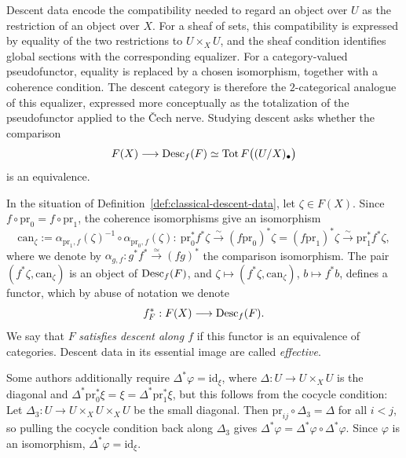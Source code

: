 Descent data encode the compatibility needed to regard an object
over $U$ as the restriction of an object over $X$. For a sheaf of
sets, this compatibility is expressed by equality of the two
restrictions to $U\times_XU$, and the sheaf condition identifies
global sections with the corresponding equalizer. For a
category-valued pseudofunctor, equality is replaced by a chosen
isomorphism, together with a coherence condition. The descent
category is therefore the $2$-categorical analogue of this
equalizer, expressed more conceptually as the totalization of
the pseudofunctor applied to the \v{C}ech nerve. Studying descent
asks whether the comparison
\[
F(X)\longrightarrow \operatorname{Desc}_f(F)
\simeq \operatorname{Tot} F\bigl((U/X)_\bullet\bigr)
\]
is an equivalence.

\begin{definition}\label{con:pullback-to-descent}
	In the situation of Definition~\ref{def:classical-descent-data}, let $\zeta\in F(X)$. Since $f\circ\mathrm{pr}_0=f\circ\mathrm{pr}_1$, the coherence isomorphisms give an isomorphism
	\[
	\mathrm{can}_\zeta:=\alpha_{\mathrm{pr}_1,f}(\zeta)^{-1}\circ\alpha_{\mathrm{pr}_0,f}(\zeta):\ \mathrm{pr}_0^*f^*\zeta\xrightarrow{\ \sim\ }(f\mathrm{pr}_0)^*\zeta=(f\mathrm{pr}_1)^*\zeta\xrightarrow{\ \sim\ }\mathrm{pr}_1^*f^*\zeta,
	\]
	where we denote by $\alpha_{g,f}: g^*f^* \xrightarrow{\simeq} (fg)^*$ the comparison isomorphism.
	The pair $(f^*\zeta,\mathrm{can}_\zeta)$ is an object of $\operatorname{Desc}_f(F)$, and $\zeta\mapsto(f^*\zeta,\mathrm{can}_\zeta)$, $b\mapsto f^*b$, defines a functor, which by abuse of notation we denote
	\[
	f_F^*:F(X)\longrightarrow\operatorname{Desc}_f(F).
	\]
	We say that $F$ \emph{satisfies descent along $f$} if this functor is an equivalence of categories. Descent data in its essential image are called \emph{effective}.
\end{definition}

\begin{remark}\label{rem:normalization-automatic}
	Some authors additionally require $\Delta^*\varphi=\mathrm{id}_\xi$, where $\Delta:U\to U\times_XU$ is the diagonal and $\Delta^*\mathrm{pr}_0^*\xi=\xi=\Delta^*\mathrm{pr}_1^*\xi$, but this follows from the cocycle condition: 
	Let $\Delta_3:U\to U\times_XU\times_XU$ be the small diagonal. Then $\mathrm{pr}_{ij}\circ\Delta_3=\Delta$ for all $i<j$, so pulling the cocycle condition back along $\Delta_3$ gives $\Delta^*\varphi=\Delta^*\varphi\circ\Delta^*\varphi$. Since $\varphi$ is an isomorphism, $\Delta^*\varphi=\mathrm{id}_\xi$.
\end{remark}

